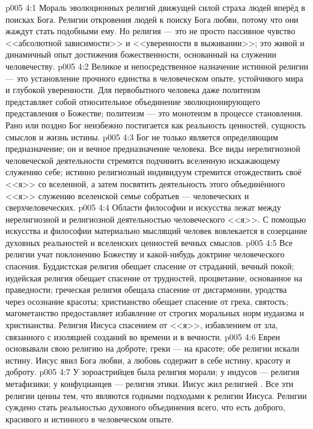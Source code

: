 \vs p005 4:1 Мораль эволюционных религий движущей силой страха  людей вперёд в поисках Бога. Религии откровения  людей к поиску Бога любви, потому что они жаждут стать подобными ему. Но религия --- это не просто пассивное чувство <<абсолютной зависимости>> и <<уверенности в выживании>>; это живой и динамичный опыт достижения божественности, основанный на служении человечеству.
\vs p005 4:2 Великое и непосредственное назначение истинной религии --- это установление прочного единства в человеческом опыте, устойчивого мира и глубокой уверенности. Для первобытного человека даже политеизм представляет собой относительное объединение эволюционирующего представления о Божестве; политеизм --- это монотеизм в процессе становления. Рано или поздно Бог неизбежно постигается как реальность ценностей, сущность смыслов и жизнь истины.
\vs p005 4:3 Бог не только является определяющим предназначение; он и  вечное предназначение человека. Все виды нерелигиозной человеческой деятельности стремятся подчинить вселенную искажающему служению себе; истинно религиозный индивидуум стремится отождествить своё <<я>> со вселенной, а затем посвятить деятельность этого объединённого <<я>> служению вселенской семье собратьев --- человеческих и сверхчеловеческих.
\vs p005 4:4 \pc Области философии и искусства лежат между нерелигиозной и религиозной деятельностью человеческого <<я>>. С помощью искусства и философии материально мыслящий человек вовлекается в созерцание духовных реальностей и вселенских ценностей вечных смыслов.
\vs p005 4:5 \pc Все религии учат поклонению Божеству и какой\hyp{}нибудь доктрине человеческого спасения. Буддистская религия обещает спасение от страданий, вечный покой; иудейская религия обещает спасение от трудностей, процветание, основанное на праведности; греческая религия обещала спасение от дисгармонии, уродства через осознание красоты; христианство обещает спасение от греха, святость; магометанство предоставляет избавление от строгих моральных норм иудаизма и христианства. Религия Иисуса  спасением от <<я>>, избавлением от зла, связанного с изоляцией созданий во времени и в вечности.
\vs p005 4:6 Евреи основывали свою религию на доброте; греки --- на красоте; обе религии искали истину. Иисус явил Бога любви, а любовь содержит в себе истину, красоту и доброту.
\vs p005 4:7 У зороастрийцев была религия морали; у индусов --- религия метафизики; у конфуцианцев --- религия этики. Иисус жил религией . Все эти религии ценны тем, что являются годными подходами к религии Иисуса. Религии суждено стать реальностью духовного объединения всего, что есть доброго, красивого и истинного в человеческом опыте.
